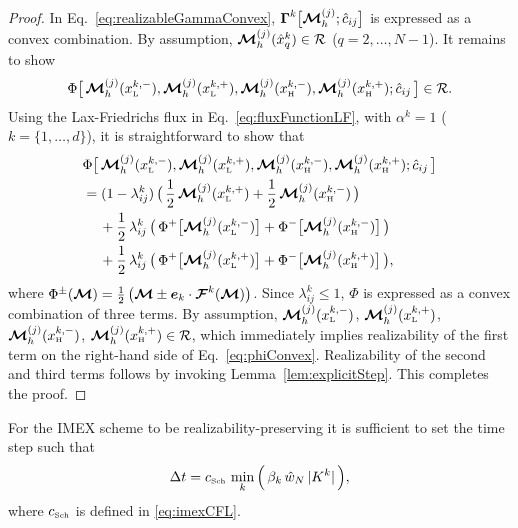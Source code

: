 \begin{proof}
  In Eq.~\eqref{eq:realizableGammaConvex}, $\boldsymbol{\Gamma}^{k}\big[\boldsymbol{\mathcal{M}}_{h}^{(j)};\hat{c}_{ij}\big]$ is expressed as a convex combination.  
  By assumption, $\boldsymbol{\mathcal{M}}_{h}^{(j)}(\hat{x}_{q}^{k})\in\mathcal{R}$ ($q=2,\ldots,N-1$).  
  It remains to show 
  \begin{equation*}
    \Phi\big[\,\boldsymbol{\mathcal{M}}_{h}^{(j)}(x_{\mbox{\tiny L}}^{k,-}),\boldsymbol{\mathcal{M}}_{h}^{(j)}(x_{\mbox{\tiny L}}^{k,+}),\boldsymbol{\mathcal{M}}_{h}^{(j)}(x_{\mbox{\tiny H}}^{k,-}),\boldsymbol{\mathcal{M}}_{h}^{(j)}(x_{\mbox{\tiny H}}^{k,+});\hat{c}_{ij}\,\big]\in\mathcal{R}.  
  \end{equation*}
  Using the Lax-Friedrichs flux in Eq.~\eqref{eq:fluxFunctionLF}, with $\alpha^{k}=1$ ($k=\{1,\ldots,d\}$), it is straightforward to show that
  \begin{align}
    &\Phi\big[\,\boldsymbol{\mathcal{M}}_{h}^{(j)}(x_{\mbox{\tiny L}}^{k,-}),\boldsymbol{\mathcal{M}}_{h}^{(j)}(x_{\mbox{\tiny L}}^{k,+}),\boldsymbol{\mathcal{M}}_{h}^{(j)}(x_{\mbox{\tiny H}}^{k,-}),\boldsymbol{\mathcal{M}}_{h}^{(j)}(x_{\mbox{\tiny H}}^{k,+});\hat{c}_{ij}\,\big] \nonumber \\
    &=(1-\lambda_{ij}^{k})\,\big(\,\frac{1}{2}\,\boldsymbol{\mathcal{M}}_{h}^{(j)}(x_{\mbox{\tiny L}}^{k,+})+\frac{1}{2}\,\boldsymbol{\mathcal{M}}_{h}^{(j)}(x_{\mbox{\tiny H}}^{k,-})\,\big) \nonumber \\
    &\hspace{12pt}
    +\frac{1}{2}\,\lambda_{ij}^{k}\,\big(\,\Phi^{+}\big[\boldsymbol{\mathcal{M}}_{h}^{(j)}(x_{\mbox{\tiny L}}^{k,-})\big]+\Phi^{-}\big[\boldsymbol{\mathcal{M}}_{h}^{(j)}(x_{\mbox{\tiny H}}^{k,-})\big]\,\big) \nonumber \\
    &\hspace{12pt}
    +\frac{1}{2}\,\lambda_{ij}^{k}\,\big(\,\Phi^{+}\big[\boldsymbol{\mathcal{M}}_{h}^{(j)}(x_{\mbox{\tiny L}}^{k,+})\big]+\Phi^{-}\big[\boldsymbol{\mathcal{M}}_{h}^{(j)}(x_{\mbox{\tiny H}}^{k,+})\big]\,\big),
    \label{eq:phiConvex}
  \end{align}
  where $\Phi^{\pm}(\boldsymbol{\mathcal{M}})=\frac{1}{2}\,\big(\boldsymbol{\mathcal{M}}\pm\boldsymbol{e}_{k}\cdot\boldsymbol{\mathcal{F}}^{k}(\boldsymbol{\mathcal{M}})\big)$.  
  Since $\lambda_{ij}^{k}\le1$, $\Phi$ is expressed as a convex combination of three terms.  
  By assumption, $\boldsymbol{\mathcal{M}}_{h}^{(j)}(x_{\mbox{\tiny L}}^{k,-})$, $\boldsymbol{\mathcal{M}}_{h}^{(j)}(x_{\mbox{\tiny L}}^{k,+})$, $\boldsymbol{\mathcal{M}}_{h}^{(j)}(x_{\mbox{\tiny H}}^{k,-})$, $\boldsymbol{\mathcal{M}}_{h}^{(j)}(x_{\mbox{\tiny H}}^{k,+})\in\mathcal{R}$, which immediately implies realizability of the first term on the right-hand side of Eq.~\eqref{eq:phiConvex}.  
  Realizability of the second and third terms follows by invoking Lemma~\ref{lem:explicitStep}.  
  This completes the proof.  
\end{proof}

\begin{rem}
  For the IMEX scheme to be realizability-preserving it is sufficient to set the time step such that
  \begin{equation}
    \Delta t = c_{\mbox{\tiny Sch}}\,\min_{k} \Big(\, \beta_{k}\,\hat{w}_{N}\,|K^{k}| \,\Big),
    \label{eq:imexTimeStep}
  \end{equation}
  where $c_{\mbox{\tiny Sch}}$ is defined in \eqref{eq:imexCFL}.  
\end{rem}

